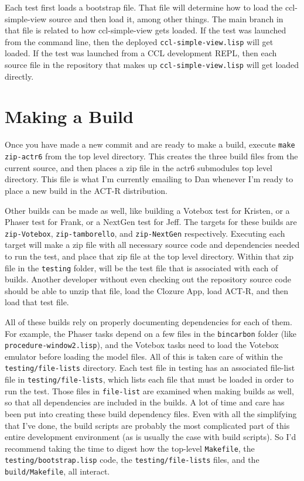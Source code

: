 \documentclass[12pt]{article} %
\newcommand{\code}[1]{\texttt{#1}}
\newcommand{\filesys}[1]{\texttt{#1}}
\begin{document}
Each test first loads a bootstrap file.
That file will determine how to load the ccl-simple-view source and then load it, among other things.
The main branch in that file is related to how ccl-simple-view gets loaded.
If the test was launched from the command line, then the deployed \filesys{ccl-simple-view.lisp} will get loaded.
If the test was launched from a CCL development REPL, then each source file in the repository that makes up \filesys{ccl-simple-view.lisp} will get loaded directly.

\section{Making a Build}

Once you have made a new commit and are ready to make a build, execute \code{make zip-actr6} from the top level directory.
This creates the three build files from the current source, and then places a zip file in the actr6 submodules top level directory.
This file is what I'm currently emailing to Dan whenever I'm ready to place a new build in the ACT-R distribution.

Other builds can be made as well, like building a Votebox test for Kristen, or a Phaser test for Frank, or a NextGen test for Jeff.
The targets for these builds are \code{zip-Votebox}, \code{zip-tamborello}, and \code{zip-NextGen} respectively.
Executing each target will make a zip file with all necessary source code and dependencies needed to run the test, and place that zip file at the top level directory.
Within that zip file in the \filesys{testing} folder, will be the test file that is associated with each of builds. 
Another developer without even checking out the repository source code should be able to unzip that file, load the Clozure App, load ACT-R, and then load that test file.

All of these builds rely on properly documenting dependencies for each of them.
For example, the Phaser tasks depend on a few files in the \filesys{bincarbon} folder (like \filesys{procedure-window2.lisp}),
and the Votebox tasks need to load the Votebox emulator before loading the model files.
All of this is taken care of within the \filesys{testing/file-lists} directory.
Each test file in testing has an associated file-list file in \filesys{testing/file-lists}, which lists each file that must be loaded in order to run the test.
Those files in \filesys{file-list} are examined when making builds as well, so that all dependencies are included in the builds.
A lot of time and care has been put into creating these build dependency files.
Even with all the simplifying that I've done, the build scripts are probably the most complicated part of this entire development environment (as is usually the case with build scripts).
So I'd recommend taking the time to digest how the top-level \filesys{Makefile}, the \filesys{testing/bootstrap.lisp} code, the \filesys{testing/file-lists} files, and the \filesys{build/Makefile}, all interact.
\end{document}
